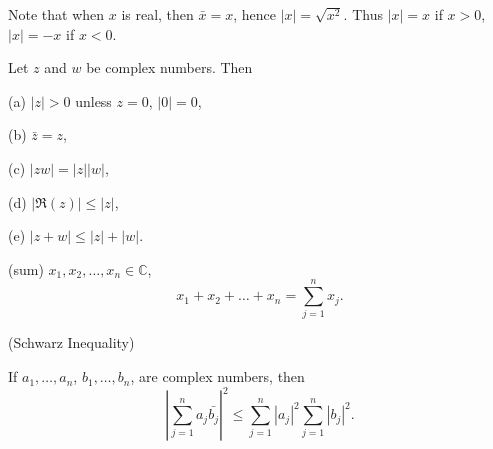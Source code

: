 Note that when $x$ is real, then $\bar{x} = x$, hence $|x| = \sqrt{x^2}$. Thus $|x| = x$
if $x>0$, $|x| = -x$ if $x <0$.

\begin{thm}\label{thm:1.33}
    Let $z$ and $w$ be complex numbers. Then
    
    (a) $|z|>0$ unless $z=0$, $|0|=0$,

    (b) $\bar{z}=z$,

    (c) $|zw| = |z||w|$,

    (d) $| \Re(z)| \leq |z|$,

    (e) $|z+w| \leq|z|+|w|$.

\end{thm}


\begin{myNotation}\label{myNotation:1.34 sum}
(sum)
$x_1,x_2,\dots,x_n \in \mathbb{C}$,
\begin{equation*}
    x_1+x_2+\dots+x_n = \sum_{j=1}^{n} x_j.
\end{equation*}
\end{myNotation}

\begin{thm}\label{thm:1.35 schwarz_inequality}
    (Schwarz Inequality)

    If 
    $a_1,\dots,a_n$, 
    $b_1,\dots,b_n$, are complex numbers, then
    \begin{equation*}
        \left| \sum_{j=1}^{n}a_j \bar{b_j}\right|^2 \leq 
        \sum_{j=1}^{n}\left|a_j\right|^2
        \sum_{j=1}^{n}\left|b_j\right|^2.
    \end{equation*}    
\end{thm}

